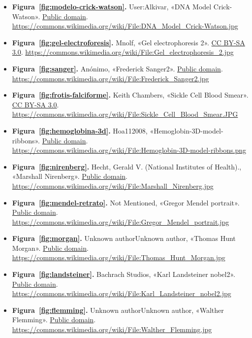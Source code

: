 \documentclass{book}
\begin{document}
\begin{itemize}
\item \textbf{Figura~\ref{fig:modelo-crick-watson}.} User:Alkivar, «DNA Model Crick-Watson». \href{https://creativecommons.org/publicdomain/mark/1.0/}{Public domain}. \url{https://commons.wikimedia.org/wiki/File:DNA_Model_Crick-Watson.jpg}
\item \textbf{Figura~\ref{fig:gel-electroforesis}.} Mnolf, «Gel electrophoresis 2». \href{https://creativecommons.org/licenses/by-sa/3.0/}{CC BY-SA 3.0}. \url{https://commons.wikimedia.org/wiki/File:Gel_electrophoresis_2.jpg}
\item \textbf{Figura~\ref{fig:sanger}.} Anónimo, «Frederick Sanger2». \href{https://creativecommons.org/publicdomain/mark/1.0/}{Public domain}. \url{https://commons.wikimedia.org/wiki/File:Frederick_Sanger2.jpg}
\item \textbf{Figura~\ref{fig:frotis-falciforme}.} Keith Chambers, «Sickle Cell Blood Smear». \href{https://creativecommons.org/licenses/by-sa/3.0/}{CC BY-SA 3.0}. \url{https://commons.wikimedia.org/wiki/File:Sickle_Cell_Blood_Smear.JPG}
\item \textbf{Figura~\ref{fig:hemoglobina-3d}.} Hoa112008, «Hemoglobin-3D-model-ribbons». \href{https://creativecommons.org/publicdomain/mark/1.0/}{Public domain}. \url{https://commons.wikimedia.org/wiki/File:Hemoglobin-3D-model-ribbons.png}
\item \textbf{Figura~\ref{fig:nirenberg}.} Hecht, Gerald V. (National Institutes of Health)., «Marshall Nirenberg». \href{https://creativecommons.org/publicdomain/mark/1.0/}{Public domain}. \url{https://commons.wikimedia.org/wiki/File:Marshall_Nirenberg.jpg}
\item \textbf{Figura~\ref{fig:mendel-retrato}.} Not Mentioned, «Gregor Mendel portrait». \href{https://creativecommons.org/publicdomain/mark/1.0/}{Public domain}. \url{https://commons.wikimedia.org/wiki/File:Gregor_Mendel_portrait.jpg}
\item \textbf{Figura~\ref{fig:morgan}.} Unknown authorUnknown author, «Thomas Hunt Morgan». \href{https://creativecommons.org/publicdomain/mark/1.0/}{Public domain}. \url{https://commons.wikimedia.org/wiki/File:Thomas_Hunt_Morgan.jpg}
\item \textbf{Figura~\ref{fig:landsteiner}.} Bachrach Studios, «Karl Landsteiner nobel2». \href{https://creativecommons.org/publicdomain/mark/1.0/}{Public domain}. \url{https://commons.wikimedia.org/wiki/File:Karl_Landsteiner_nobel2.jpg}
\item \textbf{Figura~\ref{fig:flemming}.} Unknown authorUnknown author, «Walther Flemming». \href{https://creativecommons.org/publicdomain/mark/1.0/}{Public domain}. \url{https://commons.wikimedia.org/wiki/File:Walther_Flemming.jpg}

\end{itemize}
\end{document}
